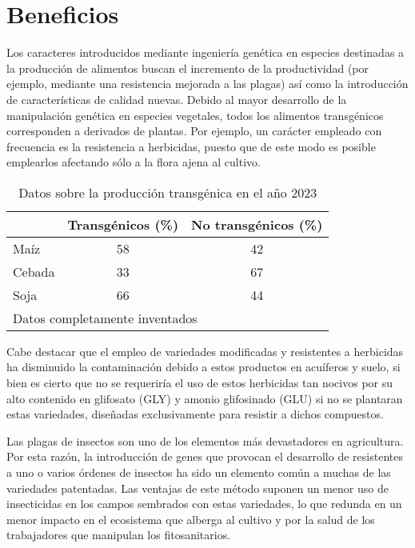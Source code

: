 \documentclass[11pt,a4paper]{article}
\begin{document}
\section{Beneficios}



Los caracteres introducidos mediante ingeniería
genética en especies destinadas a la producción de alimentos buscan el incremento de la productividad (por ejemplo, mediante una resistencia mejorada a las plagas) así como la introducción de características de calidad nuevas. Debido al mayor desarrollo de la manipulación genética en especies vegetales, todos los alimentos transgénicos corresponden a derivados de plantas. Por ejemplo, un carácter empleado con frecuencia es la resistencia a herbicidas, puesto que de este modo es posible emplearlos afectando sólo a la flora ajena al cultivo. 



\begin{table}
\begin{center}
\begin{tabular}{|l|c|c|}
\hline
     &  Transgénicos (\%)  & No transgénicos (\%)  \\
\hline\hline
Maíz  &    58  &   42 \\
\hline
Cebada &   33   &  67   \\
\hline
Soja   &  66   & 44 \\
\hline
\multicolumn{3}{l}{\footnotesize Datos completamente inventados}
\end{tabular}
\caption{Datos sobre la producción transgénica en el año 2023}
\label{tabla.transg2}
\end{center}
\end{table}



Cabe destacar que el empleo de variedades modificadas y resistentes a herbicidas ha disminuido la contaminación debido a estos productos en acuíferos y suelo,
si bien es cierto que no se requeriría el uso de estos herbicidas tan nocivos por su alto contenido en glifosato (GLY) y amonio glifosinado (GLU)
si no se plantaran estas variedades, diseñadas exclusivamente para resistir a dichos compuestos.

\bigskip


\bigskip

Las plagas de insectos son uno de los elementos más devastadores en agricultura. 
Por esta razón, la introducción de genes que provocan el desarrollo de resistentes a uno o varios órdenes de insectos ha sido un elemento común a muchas de las variedades patentadas. Las ventajas de este método suponen un menor uso de insecticidas en los campos sembrados con estas variedades,
lo que redunda en un menor impacto en el ecosistema que alberga al cultivo y por la salud de los trabajadores que manipulan los fitosanitarios.
\end{document}
